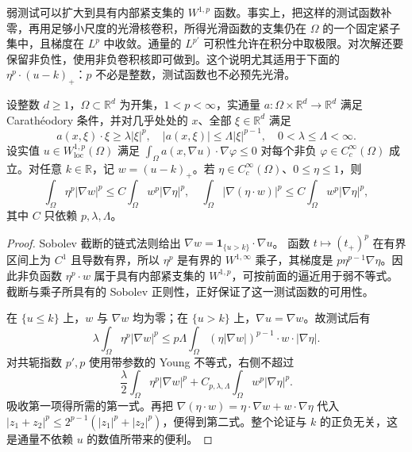\ProseParagraphBreak

弱测试可以扩大到具有内部紧支集的 \(W^{1,p}\) 函数。事实上，把这样的测试函数补零，再用足够小尺度的光滑核卷积，所得光滑函数的支集仍在 \(\Omega\) 的一个固定紧子集中，且梯度在 \(L^p\) 中收敛。通量的 \(L^{p'}\) 可积性允许在积分中取极限。对次解还要保留非负性，使用非负卷积核即可做到。这个说明尤其适用于下面的 \(\eta^p\cdot(u-k)_+\)：\(p\) 不必是整数，测试函数也不必预先光滑。

\begin{proposition}[非线性截断估计]
\label{b2:prop:H2-p-caccioppoli}
设整数 \(d\ge1\)，\(\Omega\subset\mathbb R^d\) 为开集，\(1<p<\infty\)，实通量 \(a:\Omega\times\mathbb R^d\to\mathbb R^d\) 满足 Carathéodory 条件，并对几乎处处的 \(x\)、全部 \(\xi\in\mathbb R^d\) 满足
\[
 a(x,\xi)\cdot\xi\ge\lambda|\xi|^p,
 \quad |a(x,\xi)|\le\Lambda|\xi|^{p-1},
 \quad 0<\lambda\le\Lambda<\infty.
\]
设实值 \(u\in W^{1,p}_{\mathrm{loc}}(\Omega)\) 满足
\(\int_\Omega a(x,\nabla u)\cdot\nabla\varphi\le0\)
对每个非负 \(\varphi\in C_c^\infty(\Omega)\) 成立。对任意 \(k\in\mathbb R\)，记 \(w=(u-k)_+\)。若 \(\eta\in C_c^\infty(\Omega)\)、\(0\le\eta\le1\)，则
\[
 \int_\Omega\eta^p|\nabla w|^p
 \le C\int_\Omega w^p|\nabla\eta|^p,
 \quad
 \int_\Omega|\nabla(\eta\cdot w)|^p
 \le C\int_\Omega w^p|\nabla\eta|^p,
\]
其中 \(C\) 只依赖 \(p,\lambda,\Lambda\)。
\end{proposition}
\begin{proof}
Sobolev 截断的链式法则给出
\(\nabla w=\mathbf1_{\{u>k\}}\cdot\nabla u\)。
函数 \(t\mapsto(t_+)^p\) 在有界区间上为 \(C^1\) 且导数有界，所以 \(\eta^p\) 是有界的 \(W^{1,\infty}\) 乘子，其梯度是 \(p\eta^{p-1}\nabla\eta\)。因此非负函数 \(\eta^p\cdot w\) 属于具有内部紧支集的 \(W^{1,p}\)，可按前面的逼近用于弱不等式。截断与乘子所具有的 Sobolev 正则性，正好保证了这一测试函数的可用性。

在 \(\{u\le k\}\) 上，\(w\) 与 \(\nabla w\) 均为零；在 \(\{u>k\}\) 上，\(\nabla u=\nabla w\)。故测试后有
\[
 \lambda\int_\Omega\eta^p|\nabla w|^p
 \le p\Lambda\int_\Omega
       (\eta|\nabla w|)^{p-1}\cdot w\cdot|\nabla\eta|.
\]
对共轭指数 \(p',p\) 使用带参数的 Young 不等式，右侧不超过
\[
 \frac\lambda2\int_\Omega\eta^p|\nabla w|^p
   +C_{p,\lambda,\Lambda}\int_\Omega w^p|\nabla\eta|^p.
\]
吸收第一项得所需的第一式。再把
\(\nabla(\eta\cdot w)=\eta\cdot\nabla w+w\cdot\nabla\eta\)
代入 \(|z_1+z_2|^p\le2^{p-1}(|z_1|^p+|z_2|^p)\)，便得到第二式。整个论证与 \(k\) 的正负无关，这是通量不依赖 \(u\) 的数值所带来的便利。
\end{proof}


